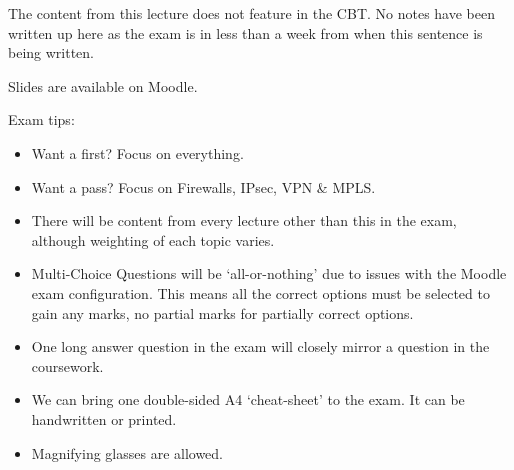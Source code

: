 
The content from this lecture does not feature in the CBT. No notes have been written up here as the exam is in less than a week from when this sentence is being written.

\begin{extlink}
Slides are available on Moodle.
\end{extlink}

Exam tips:
\begin{itemize}
    \item Want a first? Focus on everything.
    \item Want a pass? Focus on Firewalls, IPsec, VPN \& MPLS.
    \item There will be content from every lecture other than this in the exam, although weighting of each topic varies.
    \item Multi-Choice Questions will be `all-or-nothing' due to issues with the Moodle exam configuration. This means all the correct options must be selected to gain any marks, no partial marks for partially correct options. 
    \item One long answer question in the exam will closely mirror a question in the coursework.
    \item We can bring one double-sided A4 `cheat-sheet' to the exam. It can be handwritten or printed. 
    \item Magnifying glasses are allowed.
\end{itemize}